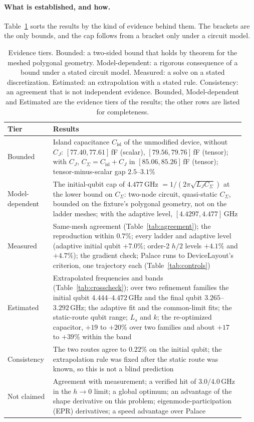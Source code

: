 \documentclass{anvil-paper}
\newcommand{\Cisl}{C_{\mathrm{isl}}}
\begin{document}
\paragraph{What is established, and how.}
Table~\ref{tab:tiers} sorts the results by the kind of evidence behind
them. The brackets are the only bounds, and the cap follows from a bracket
only under a circuit model.

\begin{table}[htbp]
  \centering
  \caption{Evidence tiers. Bounded: a two-sided bound that holds by theorem
  for the meshed polygonal geometry. Model-dependent: a rigorous consequence of a
  bound under a stated circuit model. Measured: a solve on a stated
  discretization. Estimated: an extrapolation with a stated rule.
  Consistency: an agreement that is not independent evidence. Bounded,
  Model-dependent and Estimated are the evidence tiers of the results; the
  other rows are listed for completeness.}
  \label{tab:tiers}
  \footnotesize
  \begin{tabular}{@{}>{\raggedright\arraybackslash}p{0.17\linewidth}>{\raggedright\arraybackslash}p{0.77\linewidth}@{}}
    \toprule
    Tier & Results \\
    \midrule
    Bounded & Island capacitance $\Cisl$ of the unmodified device, without $C_J$: $[77.40, 77.61]$\,fF (scalar), $[79.56, 79.76]$\,fF (tensor); with $C_J$, $C_\Sigma = \Cisl + C_J$ in $[85.06, 85.26]$\,fF (tensor); tensor-minus-scalar gap $2.5$--$3.1\%$ \\
    Model-dependent & The initial-qubit cap of $4.477$\,GHz $= 1/(2\pi\sqrt{L_J C_\Sigma})$ at the lower bound on $C_\Sigma$: two-node circuit, quasi-static $C_\Sigma$, bounded on the fixture's polygonal geometry, not on the ladder meshes; with the adaptive level, $[4.4297, 4.477]$\,GHz \\
    Measured & Same-mesh agreement (Table~\ref{tab:agreement}); the reproduction within $0.7\%$; every ladder and adaptive level (adaptive initial qubit $+7.0\%$; order-2 $h/2$ levels $+4.1\%$ and $+4.7\%$); the gradient check; Palace runs to DeviceLayout's criterion, one trajectory each (Table~\ref{tab:controls}) \\
    Estimated & Extrapolated frequencies and bands (Table~\ref{tab:crosscheck}); over two refinement families the initial qubit $4.444$--$4.472$\,GHz and the final qubit $3.265$--$3.292$\,GHz; the adaptive fit and the common-limit fits; the static-route qubit range; $L_s$ and $k$; the re-optimized capacitor, $+19$ to $+20\%$ over two families and about $+17$ to $+39\%$ within the band \\
    Consistency & The two routes agree to $0.22\%$ on the initial qubit; the extrapolation rule was fixed after the static route was known, so this is not a blind prediction \\
    Not claimed & Agreement with measurement; a verified hit of $3.0$/$4.0$\,GHz in the $h \to 0$ limit; a global optimum; an advantage of the shape derivative on this problem; eigenmode-participation (EPR) derivatives; a speed advantage over Palace \\
    \bottomrule
  \end{tabular}
\end{table}
\end{document}

